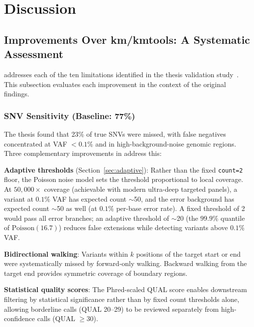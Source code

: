\section{Discussion}
\label{sec:discussion}

\subsection{Improvements Over km/kmtools: A Systematic Assessment}

\kmerdet{} addresses each of the ten limitations identified in the thesis
validation study~\cite{kamtool}.  This subsection evaluates each improvement
in the context of the original findings.

\subsubsection{SNV Sensitivity (Baseline: 77\%)}

The thesis found that 23\% of true SNVs were missed, with false negatives
concentrated at VAF $< 0.1\%$ and in high-background-noise genomic regions.
Three complementary improvements in \kmerdet{} address this:

\textbf{Adaptive thresholds} (Section~\ref{sec:adaptive}): Rather than the
fixed \texttt{count=2} floor, the Poisson noise model sets the threshold
proportional to local coverage.  At $50,000\times$ coverage (achievable with
modern ultra-deep targeted panels), a variant at $0.1\%$ VAF has expected
count $\sim$50, and the error background has expected count $\sim$50 as well
(at $0.1\%$ per-base error rate).  A fixed threshold of 2 would pass all error
branches; an adaptive threshold of $\sim$20 (the $99.9\%$ quantile of
$\text{Poisson}(16.7)$) reduces false extensions while detecting variants above
$0.1\%$ VAF.

\textbf{Bidirectional walking}: Variants within $k$ positions of the target
start or end were systematically missed by forward-only walking.  Backward
walking from the target end provides symmetric coverage of boundary regions.

\textbf{Statistical quality scores}: The Phred-scaled QUAL score enables
downstream filtering by statistical significance rather than by fixed count
thresholds alone, allowing borderline calls (QUAL 20--29) to be reviewed
separately from high-confidence calls (QUAL $\geq 30$).

